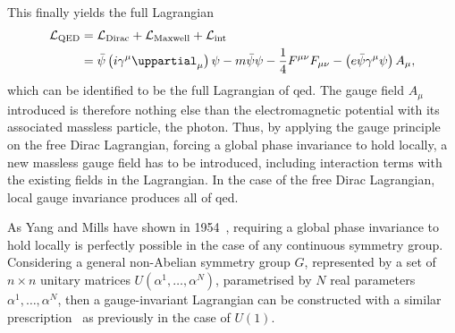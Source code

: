 This finally yields the full Lagrangian
\begin{equation}
\begin{split}
		\Lagr_\mathrm{QED} & = \Lagr_\mathrm{Dirac} + \Lagr_\mathrm{Maxwell} + \Lagr_\mathrm{int} \\
	  				& = \bar{\psi}\left(i\gamma^\mu\uppartial_\mu\right)\psi - m\bar{\psi}\psi - \frac{1}{4}F^{\mu\nu}F_{\mu\nu} - \left(e\bar{\psi}\gamma^\mu\psi\right)A_\mu,
\end{split}
\end{equation}
which can be identified to be the full Lagrangian of \gls{qed}. The gauge field $A_\mu$ introduced is therefore nothing else than the electromagnetic potential with its associated massless particle, the photon. Thus, by applying the gauge principle on the free Dirac Lagrangian, \ie forcing a global phase invariance to hold locally, a new massless gauge field has to be introduced, including interaction terms with the existing fields in the Lagrangian. In the case of the free Dirac Lagrangian, local gauge invariance produces all of \gls{qed}.

As Yang and Mills have shown in 1954~\cite{PhysRev.96.191}, requiring a global phase invariance to hold locally is perfectly possible in the case of any continuous symmetry group. Considering a general non-Abelian symmetry group $G$, represented by a set of $n\times n$ unitary matrices $U(\alpha^1,\dots,\alpha^N)$, parametrised by $N$ real parameters $\alpha^1,\dots,\alpha^N$, then a gauge-invariant Lagrangian can be constructed with a similar prescription~\cite{Brock:1354959} as previously in the case of $U(1)$. 

